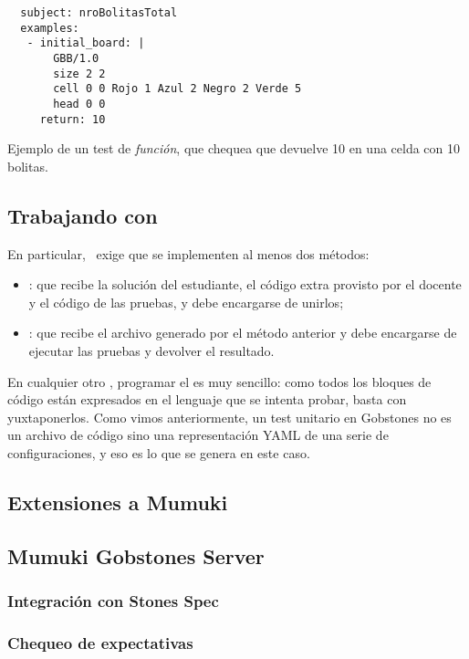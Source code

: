 \begin{listing}
  \centering

  \begin{verbatim}
  subject: nroBolitasTotal
  examples:
   - initial_board: |
       GBB/1.0
       size 2 2
       cell 0 0 Rojo 1 Azul 2 Negro 2 Verde 5
       head 0 0
     return: 10
  \end{verbatim}

  \caption{Ejemplo de un test de \emph{función}, que chequea que  devuelve 10 en una celda con 10 bolitas.}
  \label{lst:FunctionSpec}
\end{listing}


\subsection{Trabajando con \mumukit}
En particular, \mumukit\ exige que se implementen al menos dos métodos:
\begin{itemize}
  \item{: que recibe la solución del estudiante, el código extra provisto por el docente y el código de las pruebas, y debe encargarse de unirlos;}
  \item{: que recibe el archivo generado por el método anterior y debe encargarse de ejecutar las pruebas y devolver el resultado.}
\end{itemize}

En cualquier otro \runner, programar el  es muy sencillo: como todos los bloques de código están expresados en el lenguaje que se intenta probar, basta con yuxtaponerlos. Como vimos anteriormente, un test unitario en Gobstones no es un archivo de código sino una representación YAML de una serie de configuraciones, y eso es lo que se genera en este caso.

\subsection{Extensiones a Mumuki}

\subsection{Mumuki Gobstones Server}
\subsubsection{Integración con Stones Spec}
\subsubsection{Chequeo de expectativas}
